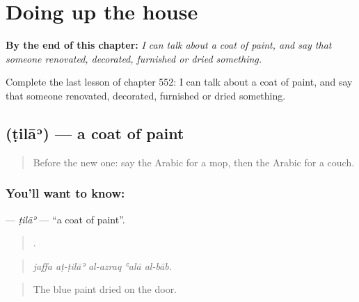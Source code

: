 
\chapter{Doing up the house}
\label{ch:ar-doing-up-the-house}

\begin{chapteropening}
\textbf{By the end of this chapter:} \emph{I can talk about a coat of paint, and say that someone renovated, decorated, furnished or dried something.}

Complete the last lesson of chapter 552: I can talk about a coat of paint, and say that someone renovated, decorated, furnished or dried something.
\end{chapteropening}

\section[\texorpdfstring{\ar{طلاء} (ṭilāʾ)}{طلاء (ṭilāʾ)}]{ (ṭilāʾ) — a coat of paint}

\label{lesson:AR-C552-tila}



\begin{quote}
Before the new one: say the Arabic for a mop, then the Arabic for a couch.
\end{quote}

\subsection*{You'll want to know: }
\textbf{} — \emph{ṭilāʾ} — \textquotedblleft{}a coat of paint\textquotedblright{}.

\begin{quote}
    .
\end{quote}

\begin{quote}
\emph{jaffa aṭ-ṭilāʾ al-azraq ʿalā al-bāb.}
\end{quote}

\begin{quote}
The blue paint dried on the door.
\end{quote}

